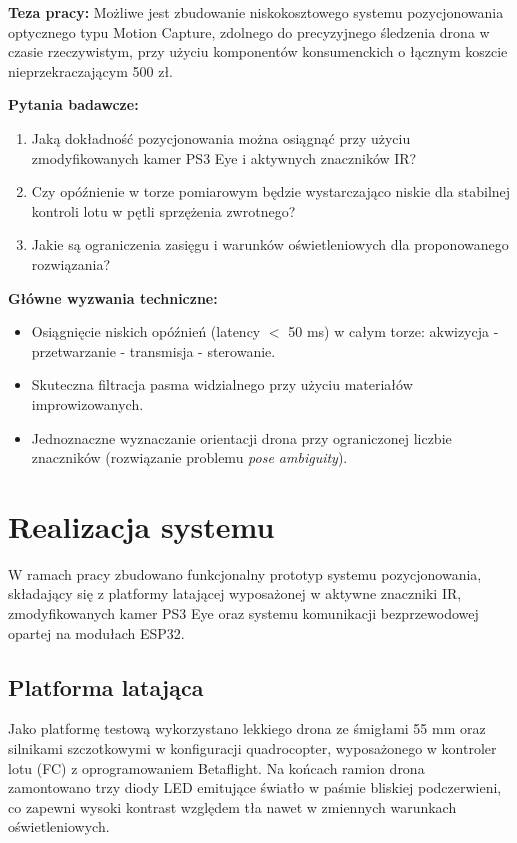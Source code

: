 \documentclass{EE-dyplom}
\begin{document}
\textbf{Teza pracy:} Możliwe jest zbudowanie niskokosztowego systemu pozycjonowania optycznego typu Motion Capture, zdolnego do precyzyjnego śledzenia drona w czasie rzeczywistym, przy użyciu komponentów konsumenckich o łącznym koszcie nieprzekraczającym 500 zł.

\textbf{Pytania badawcze:}
\begin{enumerate}
    \item Jaką dokładność pozycjonowania można osiągnąć przy użyciu zmodyfikowanych kamer PS3 Eye i aktywnych znaczników IR?
    \item Czy opóźnienie w torze pomiarowym będzie wystarczająco niskie dla stabilnej kontroli lotu w pętli sprzężenia zwrotnego?
    \item Jakie są ograniczenia zasięgu i warunków oświetleniowych dla proponowanego rozwiązania?
\end{enumerate}

\textbf{Główne wyzwania techniczne:}
\begin{itemize}
    \item Osiągnięcie niskich opóźnień (latency $<$ 50 ms) w całym torze: akwizycja - przetwarzanie - transmisja - sterowanie.
    \item Skuteczna filtracja pasma widzialnego przy użyciu materiałów improwizowanych.
    \item Jednoznaczne wyznaczanie orientacji drona przy ograniczonej liczbie znaczników (rozwiązanie problemu \textit{pose ambiguity}).
\end{itemize}

\section{Realizacja systemu}

W ramach pracy zbudowano funkcjonalny prototyp systemu pozycjonowania, składający się z platformy latającej wyposażonej w aktywne znaczniki IR, zmodyfikowanych kamer PS3 Eye oraz systemu komunikacji bezprzewodowej opartej na modułach ESP32.

\subsection{Platforma latająca}

Jako platformę testową wykorzystano lekkiego drona ze śmigłami 55 mm oraz silnikami szczotkowymi w konfiguracji quadrocopter, wyposażonego w kontroler lotu (FC) z oprogramowaniem Betaflight. Na końcach ramion drona zamontowano trzy diody LED emitujące światło w paśmie bliskiej podczerwieni, co zapewni wysoki kontrast względem tła nawet w zmiennych warunkach oświetleniowych.
\end{document}
